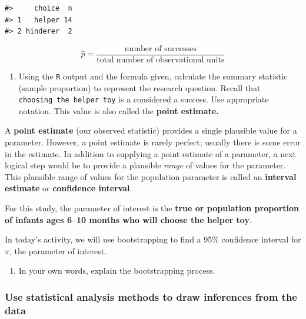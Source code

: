 \documentclass[
]{report}
\providecommand{\tightlist}{%
  \setlength{\itemsep}{0pt}\setlength{\parskip}{0pt}}
\begin{document}
\begin{verbatim}
#>     choice  n
#> 1   helper 14
#> 2 hinderer  2
\end{verbatim}

\[\hat{p} = \frac{\mbox{number of successes}}{\mbox{total number of observational units}}\]
\vspace{2mm}

\begin{enumerate}
\def\labelenumi{\arabic{enumi}.}
\setcounter{enumi}{1}
\tightlist
\item
  Using the \texttt{R} output and the formula given, calculate the summary statistic (sample proportion) to represent the research question. Recall that \texttt{choosing\ the\ helper\ toy} is a considered a success. Use appropriate notation. This value is also called the \textbf{point estimate.}
\end{enumerate}

\vspace{0.5in}
\newpage

A \textbf{point estimate} (our observed statistic) provides a single plausible value for a parameter. However, a point estimate is rarely perfect; usually there is some error in the estimate. In addition to supplying a point estimate of a parameter, a next logical step would be to provide a plausible \emph{range} of values for the parameter. This plausible range of values for the population parameter is called an \textbf{interval estimate} or \textbf{confidence interval}.

For this study, the parameter of interest is the \textbf{true or population proportion of infants ages 6--10 months who will choose the helper toy}.

In today's activity, we will use bootstrapping to find a 95\% confidence interval for \(\pi\), the parameter of interest.

\begin{enumerate}
\def\labelenumi{\arabic{enumi}.}
\setcounter{enumi}{2}
\tightlist
\item
  In your own words, explain the bootstrapping process.
  \vspace{0.6in}
\end{enumerate}

\hypertarget{use-statistical-analysis-methods-to-draw-inferences-from-the-data}{%
\subsubsection*{Use statistical analysis methods to draw inferences from the data}\label{use-statistical-analysis-methods-to-draw-inferences-from-the-data}}
\end{document}
